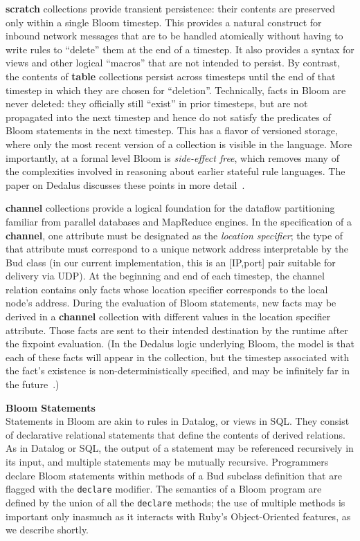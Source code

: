 {\bf scratch} collections provide transient persistence: their contents are preserved only within a single Bloom timestep.  This provides a natural construct for inbound network messages that are to be handled atomically without having to write rules to ``delete'' them at the end of a timestep.  It also provides a syntax for views and other logical ``macros'' that are not intended to persist.  By contrast, the contents of {\bf table} collections persist across timesteps until the end of that timestep in which they are chosen for ``deletion''.  Technically, facts in Bloom are never deleted: they officially still ``exist'' in prior timesteps, but are not propagated into the next timestep and hence do not satisfy the predicates of Bloom statements in the next timestep.  This has a flavor of versioned storage, where  only the most recent version of a collection is visible in the language.  More importantly, at a formal level Bloom is {\em side-effect free}, which removes many of the complexities involved in reasoning about earlier stateful rule languages.  The paper on Dedalus discusses these points in more detail~\cite{dedalus}.

{\bf channel} collections provide a logical foundation for the dataflow partitioning familiar from parallel databases and MapReduce engines.  In the specification of a {\bf channel}, one attribute must be designated as the {\em location specifier}; the type of that attribute must correspond to a unique network address interpretable by the Bud class (in our current implementation, this is an [IP,port] pair suitable for delivery via UDP).  
At the beginning and end of each timestep, the channel relation contains only facts whose location specifier corresponds to the local node's address.  During the evaluation of Bloom statements, new facts may be derived in a {\bf channel} collection with different values in the location specifier attribute.  Those facts are sent to their intended destination by the runtime after the fixpoint evaluation.  (In the Dedalus logic underlying Bloom, the model is that each of these facts will appear in the collection, but the timestep associated with the fact's existence is non-deterministically specified, and may be infinitely far in the future~\cite{dedalus}.)

{\bf Bloom Statements}\\
\noindent
Statements in Bloom are akin to rules in Datalog, or views in SQL.  They consist of declarative relational statements that define the contents of derived relations.  As in Datalog or SQL, the output of a statement may be referenced recursively in its input, and multiple statements may be mutually recursive.  Programmers declare Bloom statements within methods of a Bud subclass definition that are flagged with the {\tt declare} modifier.  The semantics of a Bloom program are defined by the union of all the {\tt declare} methods; the use of multiple methods is important only inasmuch as it interacts with Ruby's Object-Oriented features, as we describe shortly.

